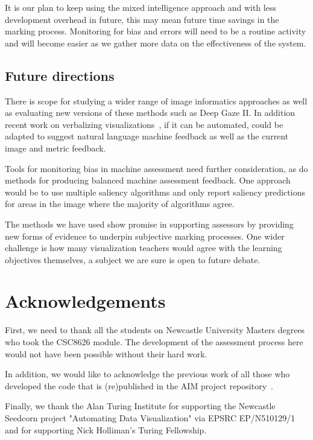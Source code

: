 It is our plan to keep using the mixed intelligence approach and with less development overhead in future, this may mean future time savings in the marking process.
Monitoring for bias and errors will need to be a routine activity and will become easier as we gather more data on the effectiveness of the system.

\subsection{Future directions}

There is scope for studying a wider range of image informatics approaches as well as evaluating new versions of these methods such as Deep Gaze II. 
In addition recent work on verbalizing visualizations~\cite{henkin2020}, if it can be automated, could be adapted to suggest natural language machine feedback as well as the current image and metric feedback.

Tools for monitoring bias in machine assessment need further consideration, as do methods for producing balanced machine assessment feedback. One approach would be to use multiple saliency algorithms and only report saliency predictions for areas in the image where the majority of algorithms agree.

The methods we have used show promise in supporting assessors by providing new forms of evidence to underpin subjective marking processes. One wider challenge is how many visualization teachers would agree with the learning objectives themselves, a subject we are sure is open to future debate.

\section{Acknowledgements}
First, we need to thank all the students on Newcastle University Masters degrees who took the CSC8626 module. The development of the assessment process here would not have been possible without their hard work. 

In addition, we would like to acknowledge the previous work of all those who developed the code that is (re)published in the AIM project repository~\cite{Oulasvirta:2018}.

Finally, we thank the Alan Turing Institute for supporting the Newcastle Seedcorn project "Automating Data Visualization" via EPSRC EP/N510129/1 and for supporting Nick Holliman's Turing Fellowship.





